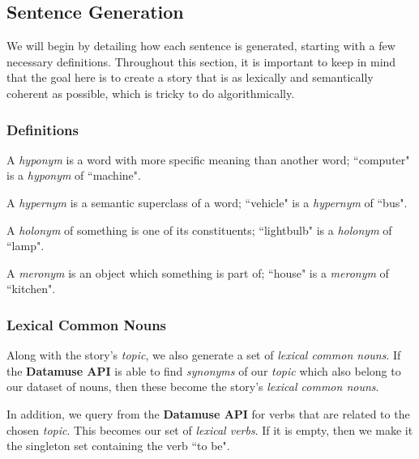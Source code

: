 \subsection{Sentence Generation}

We will begin by detailing how each sentence is generated, starting with a few necessary definitions. Throughout this section, it is important to keep in mind that the goal here is to create a story that is as lexically and semantically coherent as possible, which is tricky to do algorithmically.

\subsubsection{Definitions}

\begin{definition}[Hyponym]
A \textit{hyponym} is a word with more specific meaning than another word; ``computer" is a \textit{hyponym} of ``machine".
\end{definition}

\begin{definition}[Hypernym]
A \textit{hypernym} is a semantic superclass of a word; ``vehicle" is a \textit{hypernym} of ``bus".
\end{definition}

\begin{definition}[Holonym]
A \textit{holonym} of something is one of its constituents; ``lightbulb" is a \textit{holonym} of ``lamp".
\end{definition}

\begin{definition}[Meronym]
A \textit{meronym} is an object which something is part of; ``house" is a \textit{meronym} of ``kitchen".
\end{definition}

\subsubsection{Lexical Common Nouns}

Along with the story's \textit{topic}, we also generate a set of \textit{lexical common nouns}. If the \textbf{Datamuse API} is able to find \textit{synonyms} of our \textit{topic} which also belong to our dataset of nouns, then these become the story's \textit{lexical common nouns}.

In addition, we query from the \textbf{Datamuse API} for verbs that are related to the chosen \textit{topic}. This becomes our set of \textit{lexical verbs}. If it is empty, then we make it the singleton set containing the verb ``to be".

